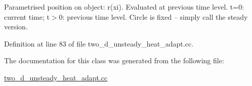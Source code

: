 Parametrised position on object\+: r(xi). Evaluated at previous time level. t=0\+: current time; t$>$0\+: previous time level. Circle is fixed -- simply call the steady version. 



Definition at line 83 of file two\+\_\+d\+\_\+unsteady\+\_\+heat\+\_\+adapt.\+cc.



The documentation for this class was generated from the following file\+:\begin{DoxyCompactItemize}
\item 
\hyperlink{two__d__unsteady__heat__adapt_8cc}{two\+\_\+d\+\_\+unsteady\+\_\+heat\+\_\+adapt.\+cc}\end{DoxyCompactItemize}

